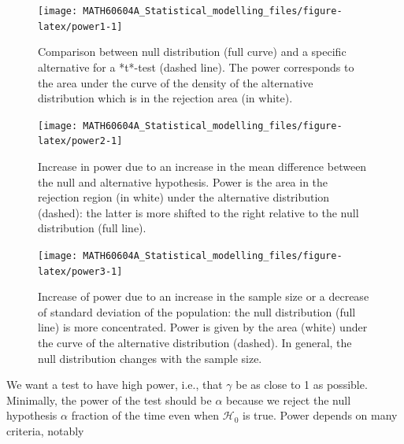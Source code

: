 \documentclass[
  11pt,
  letterpaper,
]{book}
\theoremstyle{definition}
\theoremstyle{definition}
\theoremstyle{definition}
\theoremstyle{definition}
\theoremstyle{remark}
\begin{document}
\begin{figure}

{\centering \texttt{[image: MATH60604A\_Statistical\_modelling\_files/figure-latex/power1-1]} 

}

\caption{Comparison between null distribution (full curve) and a specific alternative for a *t*-test (dashed line). The power corresponds to the area under the curve of the density of the alternative distribution which is in the rejection area (in white).}\label{fig:power1}
\end{figure}

\begin{figure}

{\centering \texttt{[image: MATH60604A\_Statistical\_modelling\_files/figure-latex/power2-1]} 

}

\caption{Increase in power due to an increase in the mean difference between the null and alternative hypothesis. Power is the area in the rejection region (in white) under the alternative distribution (dashed): the latter is more shifted to the right relative to the null distribution (full line).}\label{fig:power2}
\end{figure}

\begin{figure}

{\centering \texttt{[image: MATH60604A\_Statistical\_modelling\_files/figure-latex/power3-1]} 

}

\caption{Increase of power due to an increase in the sample size or a decrease of standard deviation of the population: the null distribution (full line) is more concentrated. Power is given by the area (white) under the curve of the alternative distribution (dashed). In general, the null distribution changes with the sample size.}\label{fig:power3}
\end{figure}

We want a test to have high power, i.e., that \(\gamma\) be as close to 1 as possible. Minimally, the power of the test should be \(\alpha\) because we reject the null hypothesis \(\alpha\) fraction of the time even when \(\mathscr{H}_0\) is true. Power depends on many criteria, notably
\end{document}
